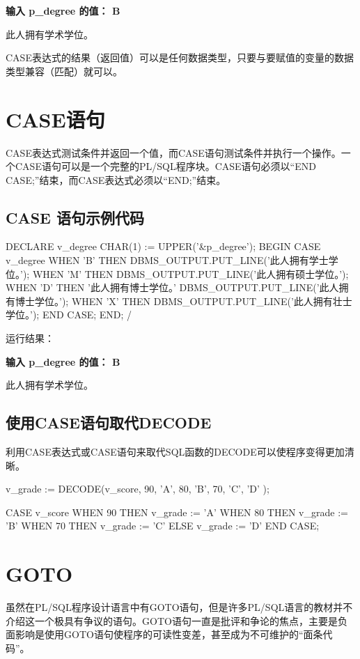 \documentclass[11pt, a4paper, oneside, UTF8]{ctexbook}
\let\kaishu\relax %
\begin{document}
{\bfseries\kaishu 输入 p\_degree 的值： B

此人拥有学术学位。}

CASE表达式的结果（返回值）可以是任何数据类型，只要与要赋值的变量的数据类型兼容（匹配）就可以。

\section{CASE语句}
CASE表达式测试条件并返回一个值，而CASE语句测试条件并执行一个操作。一个CASE语句可以是一个完整的PL/SQL程序块。CASE语句必须以“END CASE;”结束，而CASE表达式必须以“END;”结束。
\subsection{CASE 语句示例代码}
\begin{plsql}
DECLARE
  v_degree CHAR(1) := UPPER('&p_degree');
BEGIN
  CASE v_degree
    WHEN 'B' THEN 
      DBMS_OUTPUT.PUT_LINE('此人拥有学士学位。');
    WHEN 'M' THEN 
      DBMS_OUTPUT.PUT_LINE('此人拥有硕士学位。');
    WHEN 'D' THEN '此人拥有博士学位。'
      DBMS_OUTPUT.PUT_LINE('此人拥有博士学位。');
    WHEN 'X' THEN
      DBMS_OUTPUT.PUT_LINE('此人拥有壮士学位。');
  END CASE;
END;
/
\end{plsql}
运行结果：

{\bfseries\kaishu 输入 p\_degree 的值： B

此人拥有学术学位。}

\subsection{使用CASE语句取代DECODE}
利用CASE表达式或CASE语句来取代SQL函数的DECODE可以使程序变得更加清晰。
\begin{plsql}[caption=DECODE函数]
v_grade := DECODE(v_score,
  90, 'A',
  80, 'B',
  70, 'C',
  'D'
);
\end{plsql}
\begin{plsql}[caption=CASE表达式]
CASE v_score
  WHEN 90 THEN v_grade := 'A'
  WHEN 80 THEN v_grade := 'B'
  WHEN 70 THEN v_grade := 'C'
  ELSE v_grade := 'D'
END CASE;
\end{plsql}

\section{GOTO}
虽然在PL/SQL程序设计语言中有GOTO语句，但是许多PL/SQL语言的教材并不介绍这一个极具有争议的语句。GOTO语句一直是批评和争论的焦点，主要是负面影响是使用GOTO语句使程序的可读性变差，甚至成为不可维护的“面条代码”。
\end{document}

